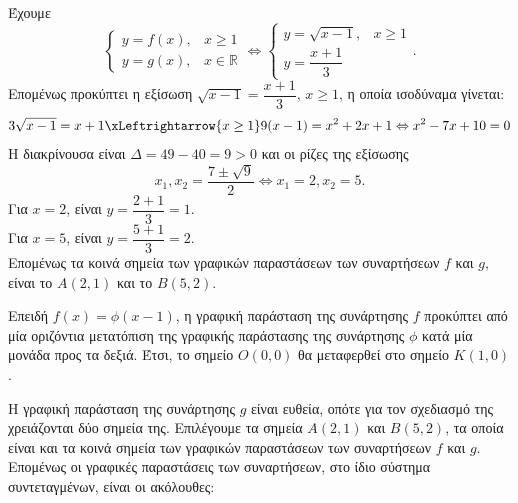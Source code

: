 \begin{alist}
\item Έχουμε  
\[\begin{cases} y = f(x), & x \ge 1 \\ y = g(x), & x \in \mathbb{R} \end{cases} \Leftrightarrow \begin{cases} y = \sqrt{x-1}, & x \ge 1 \\ y = \dfrac{x+1}{3} & \end{cases}.\]
Επομένως προκύπτει η εξίσωση $\sqrt{x-1} = \dfrac{x+1}{3}$, $x \ge 1$, η οποία ισοδύναμα γίνεται:
\[3\sqrt{x-1} = x + 1 \xLeftrightarrow{x \ge 1} 9(x-1) = x^2 + 2x + 1 \Leftrightarrow x^2 - 7x + 10 = 0\]
Η διακρίνουσα είναι $\Delta = 49 - 40 = 9 > 0$ και οι ρίζες της εξίσωσης
\[x_1, x_2 = \frac{7 \pm \sqrt{9}}{2} \Leftrightarrow x_1 = 2, x_2 = 5.\]
Για $x = 2$, είναι $y = \dfrac{2+1}{3} = 1$. \\
Για $x = 5$, είναι $y = \dfrac{5+1}{3} = 2$. \\
Επομένως τα κοινά σημεία των γραφικών παραστάσεων των συναρτήσεων $f$ και $g$, είναι το $A(2, 1)$ και το $B(5, 2)$.
\item 
\begin{rlist}
\item Επειδή $f(x) = \phi(x-1)$, η γραφική παράσταση της συνάρτησης $f$ προκύπτει από μία οριζόντια μετατόπιση της γραφικής παράστασης της συνάρτησης $\phi$ κατά μία μονάδα προς τα δεξιά. Έτσι, το σημείο $O(0, 0)$ θα μεταφερθεί στο σημείο $K(1, 0)$.
\item Η γραφική παράσταση της συνάρτησης $g$ είναι ευθεία, οπότε για τον σχεδιασμό της χρειάζονται δύο σημεία της. Επιλέγουμε τα σημεία $A(2, 1)$ και $B(5, 2)$, τα οποία είναι και τα κοινά σημεία των γραφικών παραστάσεων των συναρτήσεων $f$ και $g$. \\
Επομένως οι γραφικές παραστάσεις των συναρτήσεων, στο ίδιο σύστημα συντεταγμένων, είναι οι ακόλουθες:
\end{rlist}
\end{alist}

